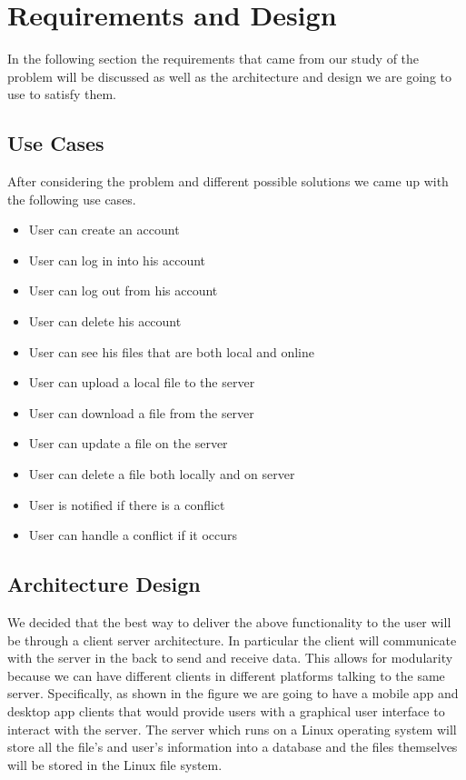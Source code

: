 \documentclass[11pt]{article}
\begin{document}

\section{Requirements and Design}

In the following section the requirements that came from our study of the problem will be discussed as well as the architecture and design we are going to use to satisfy them.

\subsection{Use Cases}

After considering the problem and different possible solutions we came up with the following use cases.

\begin{itemize}
	\item{User can create an account}
	\item{User can log in into his account}
	\item{User can log out from his account}
	\item{User can delete his account}
	\item{User can see his files that are both local and online}
	\item{User can upload a local file to the server}
	\item{User can download a file from the server}
	\item{User can update a file on the server}
	\item{User can delete a file both locally and on server}
	\item{User is notified if there is a conflict}
	\item{User can handle a conflict if it occurs}
\end{itemize}

\subsection{Architecture Design}

We decided that the best way to deliver the above functionality to the user will be through a client server architecture. In particular the client will communicate with the server in the back to send and receive data. This allows for modularity because we can have different clients in different platforms talking to the same server. Specifically, as shown in the figure we are going to have a mobile app and desktop app clients that would provide users with a graphical user interface to interact with the server. The server which runs on a Linux operating system will store all the file’s and user’s information into a database and the files themselves will be stored in the Linux file system.
\end{document}

